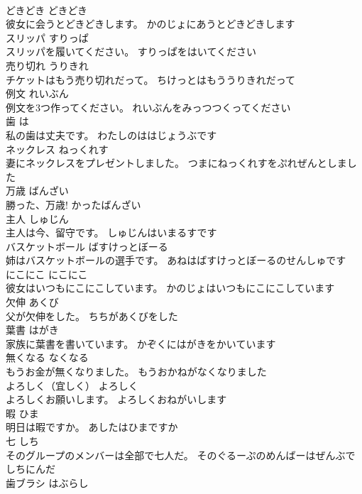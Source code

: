\documentclass[8pt]{extreport}
\begin{document}
\begin{CJK}{UTF8}{min}
\\	どきどき	どきどき	
\\	彼女に会うとどきどきします。	かのじょにあうとどきどきします	
\\	スリッパ	すりっぱ	
\\	スリッパを履いてください。	すりっぱをはいてください	
\\	売り切れ	うりきれ	
\\	チケットはもう売り切れだって。	ちけっとはもううりきれだって	
\\	例文	れいぶん	
\\	例文を3つ作ってください。	れいぶんをみっつつくってください	
\\	歯	は	
\\	私の歯は丈夫です。	わたしのははじょうぶです	
\\	ネックレス	ねっくれす	
\\	妻にネックレスをプレゼントしました。	つまにねっくれすをぷれぜんとしました	
\\	万歳	ばんざい	
\\	勝った、万歳!	かったばんざい	
\\	主人	しゅじん	
\\	主人は今、留守です。	しゅじんはいまるすです	
\\	バスケットボール	ばすけっとぼーる	
\\	姉はバスケットボールの選手です。	あねはばすけっとぼーるのせんしゅです	
\\	にこにこ	にこにこ	
\\	彼女はいつもにこにこしています。	かのじょはいつもにこにこしています	
\\	欠伸	あくび	
\\	父が欠伸をした。	ちちがあくびをした	
\\	葉書	はがき	
\\	家族に葉書を書いています。	かぞくにはがきをかいています	
\\	無くなる	なくなる	
\\	もうお金が無くなりました。	もうおかねがなくなりました	
\\	よろしく（宜しく）	よろしく	
\\	よろしくお願いします。	よろしくおねがいします	
\\	暇	ひま	
\\	明日は暇ですか。	あしたはひまですか	
\\	七	しち	
\\	そのグループのメンバーは全部で七人だ。	そのぐるーぷのめんばーはぜんぶでしちにんだ	
\\	歯ブラシ	はぶらし	

\end{CJK}
\end{document}
